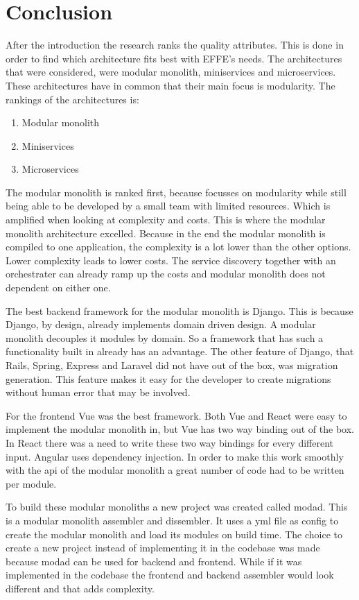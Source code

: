 \chapter{Conclusion}

After the introduction the research ranks the quality attributes. This is done in order to find which architecture fits best with EFFE's needs. The architectures that were considered, were modular monolith, miniservices and microservices. These architectures have in common that their main focus is modularity. The rankings of the architectures is:
\begin{enumerate}
  \item Modular monolith
  \item Miniservices
  \item Microservices
\end{enumerate}

The modular monolith is ranked first, because focusses on modularity while still being able to be developed by a small team with limited resources. Which is amplified when looking at complexity and costs. This is where the modular monolith architecture excelled. Because in the end the modular monolith is compiled to one application, the complexity is a lot lower than the other options. Lower complexity leads to lower costs. The service discovery together with an orchestrater can already ramp up the costs and modular monolith does not dependent on either one.

The best backend framework for the modular monolith is Django. This is because Django, by design, already implements domain driven design. A modular monolith decouples it modules by domain. So a framework that has such a functionality built in already has an advantage. The other feature of Django, that Rails, Spring, Express and Laravel did not have out of the box, was migration generation. This feature makes it easy for the developer to create migrations without human error that may be involved.

For the frontend Vue was the best framework. Both Vue and React were easy to implement the modular monolith in, but Vue has two way binding out of the box. In React there was a need to write these two way bindings for every different input. Angular uses dependency injection. In order to make this work smoothly with the api of the modular monolith a great number of code had to be written per module.

To build these modular monoliths a new project was created called modad. This is a modular monolith assembler and dissembler. It uses a yml file as config to create the modular monolith and load its modules on build time. The choice to create a new project instead of implementing it in the codebase was made because modad can be used for backend and frontend. While if it was implemented in the codebase the frontend and backend assembler would look different and that adds complexity.
